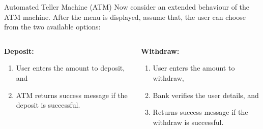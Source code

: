 \documentclass[10pt]{beamer}
\theoremstyle{plain}
\theoremstyle{definition}
\begin{document}
\begin{frame}{Automated Teller Machine (ATM)}
	Now consider an extended behaviour of the ATM machine. After the menu is displayed, assume that, the user can choose from the two available options:
	\vspace{0.5cm}
	\begin{columns}[T]
		\begin{column}{0.4\textwidth}
			\textbf{Deposit:}
			\begin{enumerate}
				\item User enters the amount to deposit, and
				\item ATM returns success message if the deposit is successful.
			\end{enumerate}
		\end{column}
		\begin{column}{0.51\textwidth}
			\textbf{Withdraw:}
			\begin{enumerate}
				\item User enters the amount to withdraw,
				\item Bank verifies the user details, and
				\item Returns success message if the withdraw is successful.
			\end{enumerate}
		\end{column}
	\end{columns}
\end{frame}
\end{document}
